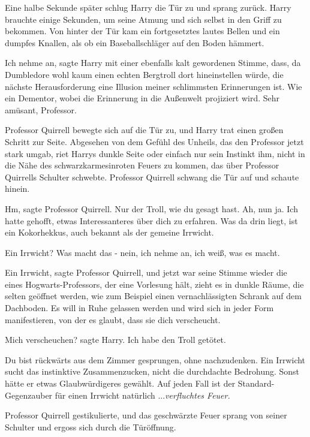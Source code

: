 Eine halbe Sekunde später schlug Harry die Tür zu und sprang zurück. Harry
brauchte einige Sekunden, um seine Atmung und sich selbst in den Griff zu
bekommen. Von hinter der Tür kam ein fortgesetztes lautes Bellen und ein dumpfes
Knallen, als ob ein Baseballschläger auf den Boden hämmert.

\glqq{}Ich nehme an\grqq{}, sagte Harry mit einer ebenfalls kalt gewordenen
Stimme, \glqq{}dass, da Dumbledore wohl kaum einen echten Bergtroll dort
hineinstellen würde, die nächste Herausforderung eine Illusion meiner
schlimmsten Erinnerungen ist. Wie ein Dementor, wobei die Erinnerung in die
Außenwelt projiziert wird. Sehr amüsant, Professor.\grqq{}

Professor Quirrell bewegte sich auf die Tür zu, und Harry trat einen großen
Schritt zur Seite. Abgesehen von dem Gefühl des Unheils, das den Professor jetzt
stark umgab, riet Harrys dunkle Seite oder einfach nur sein Instinkt ihm, nicht
in die Nähe des schwarzkarmesinroten Feuers zu kommen, das über Professor
Quirrells Schulter schwebte. Professor Quirrell schwang die Tür auf und schaute
hinein.

\glqq{}Hm\grqq{}, sagte Professor Quirrell. \glqq{}Nur der Troll, wie du gesagt
hast. Ah, nun ja. Ich hatte gehofft, etwas Interessanteres über dich zu
erfahren. Was da drin liegt, ist ein Kokorhekkus, auch bekannt als der gemeine
Irrwicht.\grqq{}

\glqq{}Ein Irrwicht? Was macht das - nein, ich nehme an, ich weiß, was es macht.\grqq{}

\glqq{}Ein Irrwicht\grqq{}, sagte Professor Quirrell, und jetzt war seine Stimme
wieder die eines Hogwarts-Professors, der eine Vorlesung hält, \glqq{}zieht es in
dunkle Räume, die selten geöffnet werden, wie zum Beispiel einen
vernachlässigten Schrank auf dem Dachboden. Es will in Ruhe gelassen werden und
wird sich in jeder Form manifestieren, von der es glaubt, dass sie dich
verscheucht.\grqq{}

\glqq{}Mich verscheuchen?\grqq{} sagte Harry. \glqq{}Ich habe den Troll getötet.\grqq{}

\glqq{}Du bist rückwärts aus dem Zimmer gesprungen, ohne nachzudenken. Ein
Irrwicht sucht das instinktive Zusammenzucken, nicht die durchdachte Bedrohung.
Sonst hätte er etwas Glaubwürdigeres gewählt. Auf jeden Fall ist der
Standard-Gegenzauber für einen Irrwicht natürlich ...\emph{verfluchtes Feuer.}\grqq{}

Professor Quirrell gestikulierte, und das geschwärzte Feuer sprang von seiner
Schulter und ergoss sich durch die Türöffnung.


